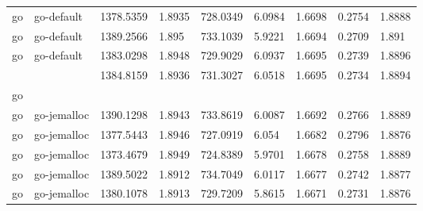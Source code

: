 \begin{longtable}[h]{|lllllllll|}
go             & go-default             & 1378.5359                 & 1.8935                                                               & 728.0349              & 6.0984           & 1.6698           & 0.2754       & 1.8888        \\
go             & go-default             & 1389.2566                 & 1.895                                                                & 733.1039              & 5.9221           & 1.6694           & 0.2709       & 1.891         \\
go             & go-default             & 1383.0298                 & 1.8948                                                               & 729.9029              & 6.0937           & 1.6695           & 0.2739       & 1.8896        \\
               &                        & 1384.8159                 & 1.8936                                                               & 731.3027              & 6.0518           & 1.6695           & 0.2734       & 1.8894        \\
go             &                        &                           &                                                                      &                       &                  &                  &              &               \\
go             & go-jemalloc            & 1390.1298                 & 1.8943                                                               & 733.8619              & 6.0087           & 1.6692           & 0.2766       & 1.8889        \\
go             & go-jemalloc            & 1377.5443                 & 1.8946                                                               & 727.0919              & 6.054            & 1.6682           & 0.2796       & 1.8876        \\
go             & go-jemalloc            & 1373.4679                 & 1.8949                                                               & 724.8389              & 5.9701           & 1.6678           & 0.2758       & 1.8889        \\
go             & go-jemalloc            & 1389.5022                 & 1.8912                                                               & 734.7049              & 6.0117           & 1.6677           & 0.2742       & 1.8877        \\
go             & go-jemalloc            & 1380.1078                 & 1.8913                                                               & 729.7209              & 5.8615           & 1.6671           & 0.2731       & 1.8876        \\

\end{longtable}
